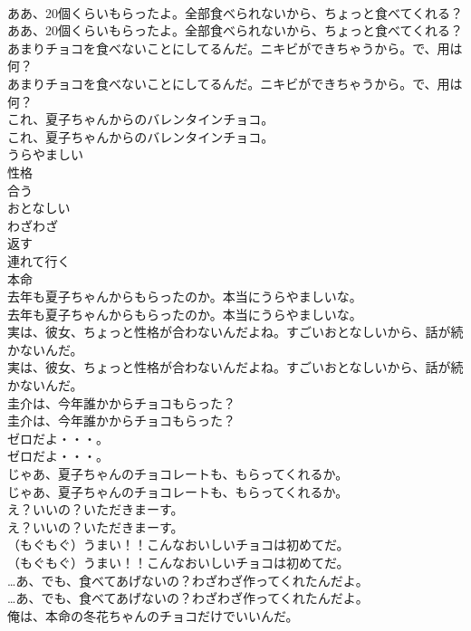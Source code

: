\documentclass[8pt]{extreport}
\begin{document}
\begin{CJK}{UTF8}{min}
\\	ああ、20個くらいもらったよ。全部食べられないから、ちょっと食べてくれる？	
\\	ああ、20個くらいもらったよ。全部食べられないから、ちょっと食べてくれる？ 
\\	あまりチョコを食べないことにしてるんだ。ニキビができちゃうから。で、用は何？	
\\	あまりチョコを食べないことにしてるんだ。ニキビができちゃうから。で、用は何？ 
\\	これ、夏子ちゃんからのバレンタインチョコ。	
\\	これ、夏子ちゃんからのバレンタインチョコ。 
\\	うらやましい
\\	性格
\\	合う
\\	おとなしい
\\	わざわざ
\\	返す
\\	連れて行く
\\	本命
\\	去年も夏子ちゃんからもらったのか。本当にうらやましいな。	
\\	去年も夏子ちゃんからもらったのか。本当にうらやましいな。 
\\	実は、彼女、ちょっと性格が合わないんだよね。すごいおとなしいから、話が続かないんだ。	
\\	実は、彼女、ちょっと性格が合わないんだよね。すごいおとなしいから、話が続かないんだ。 
\\	圭介は、今年誰かからチョコもらった？	
\\	圭介は、今年誰かからチョコもらった？ 
\\	ゼロだよ・・・。	
\\	ゼロだよ・・・。 
\\	じゃあ、夏子ちゃんのチョコレートも、もらってくれるか。	
\\	じゃあ、夏子ちゃんのチョコレートも、もらってくれるか。 
\\	え？いいの？いただきまーす。	
\\	え？いいの？いただきまーす。 
\\	（もぐもぐ）うまい！！こんなおいしいチョコは初めてだ。	
\\	（もぐもぐ）うまい！！こんなおいしいチョコは初めてだ。 
\\	…あ、でも、食べてあげないの？わざわざ作ってくれたんだよ。	
\\	…あ、でも、食べてあげないの？わざわざ作ってくれたんだよ。 
\\	俺は、本命の冬花ちゃんのチョコだけでいいんだ。	

\end{CJK}
\end{document}
